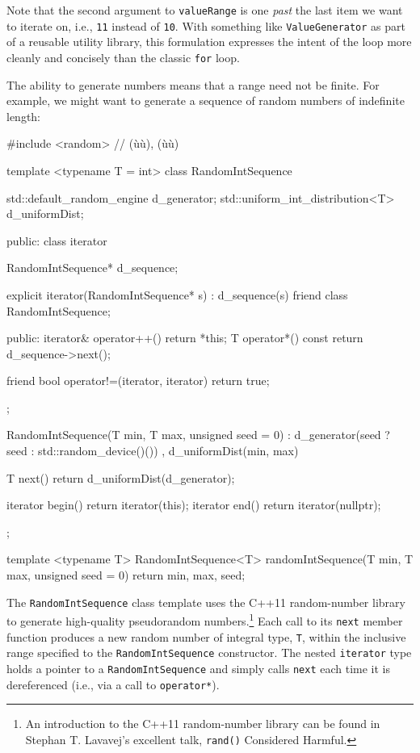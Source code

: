 {{\noindent Note that the second argument to \lstinline!valueRange! is one \emph{past}
the last item we want to iterate on, i.e., \lstinline!11! instead of
\lstinline!10!. With something like \lstinline!ValueGenerator! as part of a
reusable utility library, this formulation expresses the intent of the
loop more cleanly and concisely than the classic \lstinline!for! loop.

The ability to generate numbers means that a range need not be finite.
For example, we might want to generate a sequence of random numbers of
indefinite length:

\begin{emcppslisting}
#include <random>  // (ù{}ù), (ù{}ù)

template <typename T = int>
class RandomIntSequence
{
    std::default_random_engine       d_generator;
    std::uniform_int_distribution<T> d_uniformDist;

public:
    class iterator
    {
        RandomIntSequence* d_sequence;

        explicit iterator(RandomIntSequence* s) : d_sequence(s) { }
        friend class RandomIntSequence;

    public:
        iterator& operator++() { return *this; }
        T operator*() const { return d_sequence->next(); }

        friend bool operator!=(iterator, iterator) { return true; }
    };

    RandomIntSequence(T min, T max, unsigned seed = 0)
        : d_generator(seed ? seed : std::random_device()())
        , d_uniformDist(min, max) { }

    T next() { return d_uniformDist(d_generator); }

    iterator begin() { return iterator(this); }
    iterator end()   { return iterator(nullptr); }
};

template <typename T>
RandomIntSequence<T> randomIntSequence(T min, T max, unsigned seed = 0)
{
    return {min, max, seed};
}
\end{emcppslisting}
    

\noindent The \lstinline!RandomIntSequence! class template uses the C++11
random-number library to generate high-quality pseudorandom
numbers.{\cprotect\footnote{An introduction to the C++11 random-number
library can be found in Stephan T. Lavavej's excellent talk,
  \lstinline!rand()! Considered Harmful.}} Each call to its \lstinline!next!
member function produces a new random number of integral type,
\lstinline!T!, within the inclusive range specified to the
\lstinline!RandomIntSequence! constructor. The nested \lstinline!iterator!
type holds a pointer to a \lstinline!RandomIntSequence! and simply calls
\lstinline!next! each time it is dereferenced (i.e., via a call to
\lstinline!operator*!).

}}
